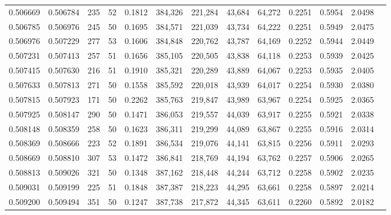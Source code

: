 \begin{tabular}{rrrrrrrrrrrrr}
0.506669 & 0.506784 &   235 &  52 &                                     0.1812 & 384,326 & 221,284 &  43,684 &  64,272 & 0.2251 & 0.5954 & 2.0498 \\
0.506785 & 0.506976 &   245 &  50 &                                     0.1695 & 384,571 & 221,039 &  43,734 &  64,222 & 0.2251 & 0.5949 & 2.0475 \\
0.506976 & 0.507229 &   277 &  53 &                                     0.1606 & 384,848 & 220,762 &  43,787 &  64,169 & 0.2252 & 0.5944 & 2.0449 \\
0.507231 & 0.507413 &   257 &  51 &                                     0.1656 & 385,105 & 220,505 &  43,838 &  64,118 & 0.2253 & 0.5939 & 2.0425 \\
0.507415 & 0.507630 &   216 &  51 &                                     0.1910 & 385,321 & 220,289 &  43,889 &  64,067 & 0.2253 & 0.5935 & 2.0405 \\
0.507633 & 0.507813 &   271 &  50 &                                     0.1558 & 385,592 & 220,018 &  43,939 &  64,017 & 0.2254 & 0.5930 & 2.0380 \\
0.507815 & 0.507923 &   171 &  50 &                                     0.2262 & 385,763 & 219,847 &  43,989 &  63,967 & 0.2254 & 0.5925 & 2.0365 \\
0.507925 & 0.508147 &   290 &  50 &                                     0.1471 & 386,053 & 219,557 &  44,039 &  63,917 & 0.2255 & 0.5921 & 2.0338 \\
0.508148 & 0.508359 &   258 &  50 &                                     0.1623 & 386,311 & 219,299 &  44,089 &  63,867 & 0.2255 & 0.5916 & 2.0314 \\
0.508369 & 0.508666 &   223 &  52 &                                     0.1891 & 386,534 & 219,076 &  44,141 &  63,815 & 0.2256 & 0.5911 & 2.0293 \\
0.508669 & 0.508810 &   307 &  53 &                                     0.1472 & 386,841 & 218,769 &  44,194 &  63,762 & 0.2257 & 0.5906 & 2.0265 \\
0.508813 & 0.509026 &   321 &  50 &                                     0.1348 & 387,162 & 218,448 &  44,244 &  63,712 & 0.2258 & 0.5902 & 2.0235 \\
0.509031 & 0.509199 &   225 &  51 &                                     0.1848 & 387,387 & 218,223 &  44,295 &  63,661 & 0.2258 & 0.5897 & 2.0214 \\
0.509200 & 0.509494 &   351 &  50 &                                     0.1247 & 387,738 & 217,872 &  44,345 &  63,611 & 0.2260 & 0.5892 & 2.0182 \\

\end{tabular}
